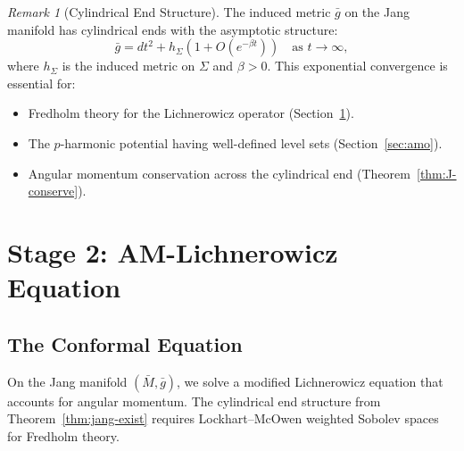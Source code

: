 \documentclass[12pt]{article}
\theoremstyle{plain}
\theoremstyle{definition}
\theoremstyle{remark}
\newtheorem{remark}[theorem]{Remark}
\newcommand{\bg}{\bar{g}}
\newcommand{\bM}{\bar{M}}
\begin{document}
\begin{remark}[Cylindrical End Structure]
The induced metric $\bg$ on the Jang manifold has cylindrical ends with the asymptotic structure:
\[
\bg = dt^2 + h_{\Sigma}(1 + O(e^{-\beta t})) \quad \text{as } t \to \infty,
\]
where $h_\Sigma$ is the induced metric on $\Sigma$ and $\beta > 0$. This exponential convergence is essential for:
\begin{itemize}
    \item Fredholm theory for the Lichnerowicz operator (Section~\ref{sec:lichnerowicz}).
    \item The $p$-harmonic potential having well-defined level sets (Section~\ref{sec:amo}).
    \item Angular momentum conservation across the cylindrical end (Theorem~\ref{thm:J-conserve}).
\end{itemize}
\end{remark}


\section{Stage 2: AM-Lichnerowicz Equation}\label{sec:lichnerowicz}

\subsection{The Conformal Equation}

On the Jang manifold $(\bM, \bg)$, we solve a modified Lichnerowicz equation that accounts for angular momentum. The cylindrical end structure from Theorem~\ref{thm:jang-exist} requires Lockhart--McOwen weighted Sobolev spaces for Fredholm theory.
\end{document}
